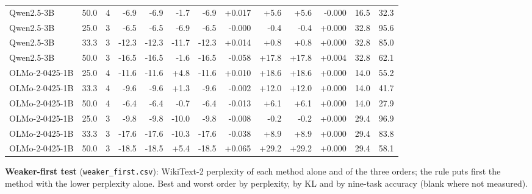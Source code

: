 \documentclass{article}
\begin{document}
\begin{longtable}{lrrrrrrrrrrrr}
Qwen2.5-3B & 50.0 & 4 & -6.9 & -6.9 & -1.7 & -6.9 & +0.017 & +5.6 & +5.6 & -0.000 & 16.5 & 32.3 \\
Qwen2.5-3B & 25.0 & 3 & -6.5 & -6.5 & -6.9 & -6.5 & -0.000 & -0.4 & -0.4 & +0.000 & 32.8 & 95.6 \\
Qwen2.5-3B & 33.3 & 3 & -12.3 & -12.3 & -11.7 & -12.3 & +0.014 & +0.8 & +0.8 & +0.000 & 32.8 & 85.0 \\
Qwen2.5-3B & 50.0 & 3 & -16.5 & -16.5 & -1.6 & -16.5 & -0.058 & +17.8 & +17.8 & +0.004 & 32.8 & 62.1 \\
OLMo-2-0425-1B & 25.0 & 4 & -11.6 & -11.6 & +4.8 & -11.6 & +0.010 & +18.6 & +18.6 & +0.000 & 14.0 & 55.2 \\
OLMo-2-0425-1B & 33.3 & 4 & -9.6 & -9.6 & +1.3 & -9.6 & -0.002 & +12.0 & +12.0 & +0.000 & 14.0 & 41.7 \\
OLMo-2-0425-1B & 50.0 & 4 & -6.4 & -6.4 & -0.7 & -6.4 & -0.013 & +6.1 & +6.1 & +0.000 & 14.0 & 27.9 \\
OLMo-2-0425-1B & 25.0 & 3 & -9.8 & -9.8 & -10.0 & -9.8 & -0.008 & -0.2 & -0.2 & +0.000 & 29.4 & 96.9 \\
OLMo-2-0425-1B & 33.3 & 3 & -17.6 & -17.6 & -10.3 & -17.6 & -0.038 & +8.9 & +8.9 & +0.000 & 29.4 & 83.8 \\
OLMo-2-0425-1B & 50.0 & 3 & -18.5 & -18.5 & +5.4 & -18.5 & +0.065 & +29.2 & +29.2 & +0.000 & 29.4 & 58.1 \\
\bottomrule\end{longtable}
\textbf{Weaker-first test} (\texttt{weaker\_first.csv}): WikiText-2 perplexity of each method alone and of the three orders; the rule puts first the method with the lower perplexity alone. Best and worst order by perplexity, by KL and by nine-task accuracy (blank where not measured).
\end{document}

